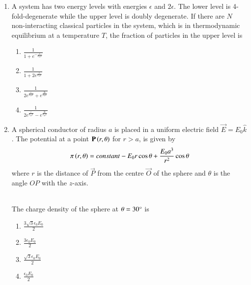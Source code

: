 \documentclass[journal]{IEEEtran}
\begin{document}
\begin{enumerate}
\begin{multicols}{4}
\begin{enumerate}
        \item $3k_B \ln N$
        \item $Nk_B \ln 2$
        \item $Nk_B \ln 3$
    \end{enumerate}
\end{multicols}
\item A system has two energy levels with energies $\epsilon$ and $2\epsilon$. The lower level is 4-fold-degenerate while the upper level is doubly degenerate. If there are $N$ non-interacting classical particles in the system, which is in thermodynamic equilibrium at a temperature $T$, the fraction of particles in the upper level is
\begin{multicols}{2}
    \begin{enumerate}
        \item $\frac{1}{1+e^{-\frac{\epsilon}{k_BT}}}$
        \item $\frac{1}{1+2e^{\frac{\epsilon}{k_BT}}}$
        \item $\frac{1}{2e^{\frac{\epsilon}{k_BT}}+e^{\frac{2\epsilon}{k_BT}}}$
        \item $\frac{1}{2e^{\frac{\epsilon}{k_BT}}-e^{\frac{2\epsilon}{k_BT}}}$
    \end{enumerate}
\end{multicols}
\item A spherical conductor of radius $a$ is placed in a uniform electric field $\vec{E}=E_0\hat{k}$. The potential at a point $\mathbf{P}\left(r,\theta\right)$ for $ r>a $, is given by
\begin{align*}
    \pi \left(r,\theta\right)=constant-E_0r\cos\theta +\frac{E_0a^3}{r^2}\cos\theta
\end{align*}
where $r$ is the distance of $\vec{P}$ from the centre $\vec{O}$ of the sphere and $\theta$ is the angle $OP$ with the $z$-axis.

\\The charge density of the sphere at $\theta = 30\degree$ is
\begin{multicols}{4}
    \begin{enumerate}
        \item $\frac{3\sqrt{3}\epsilon_0E_0}{2}$
        \item $\frac{3\epsilon_0E_0}{2}$
        \item $\frac{\sqrt{3}\epsilon_0E_0}{2}$
        \item $\frac{\epsilon_0E_0}{2}$

\end{enumerate}
\end{multicols}
\end{enumerate}
\end{document}
